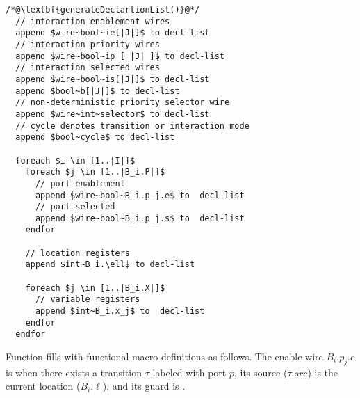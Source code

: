 \begin{lstlisting}
/*@\textbf{generateDeclartionList()}@*/
  // interaction enablement wires
  append $wire~bool~ie[|J|]$ to decl-list
  // interaction priority wires
  append $wire~bool~ip [ |J| ]$ to decl-list 
  // interaction selected wires
  append $wire~bool~is[|J|]$ to decl-list 
  append $bool~b[|J|]$ to decl-list 
  // non-deterministic priority selector wire
  append $wire~int~selector$ to decl-list 
  // cycle denotes transition or interaction mode
  append $bool~cycle$ to decl-list  

  foreach $i \in [1..|I|]$
    foreach $j \in [1..|B_i.P|]$ 
      // port enablement
      append $wire~bool~B_i.p_j.e$ to  decl-list 
      // port selected
      append $wire~bool~B_i.p_j.s$ to  decl-list 
    endfor

    // location registers
    append $int~B_i.\ell$ to decl-list
    
    foreach $j \in [1..|B_i.X|]$ 
      // variable registers
      append $int~B_i.x_j$ to  decl-list 
    endfor
  endfor
\end{lstlisting}


Function  fills  with functional macro definitions as follows. The enable wire $B_i.p_j.e$ is \true when there exists a transition $\tau$ labeled with port $p$, its source ($\tau.src$) is the current location ($B_i.\ell$), and its guard is \true. 

